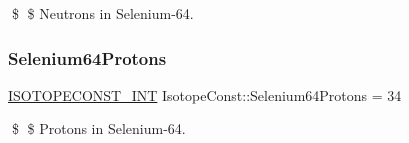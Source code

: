 \$ \$ Neutrons in Selenium-\/64. \mbox{\label{group___isotope_const-_selenium-_se64_ga47498d75298e505775af78463e106aaa}} 
\subsubsection{\texorpdfstring{Selenium64\+Protons}{Selenium64Protons}}
{\footnotesize\ttfamily \mbox{\hyperlink{group___isotope_const-_macros_ga5f18360b3e99483a35c32d789e62621c}{I\+S\+O\+T\+O\+P\+E\+C\+O\+N\+S\+T\+\_\+\+I\+NT}} Isotope\+Const\+::\+Selenium64\+Protons = 34}

\$ \$ Protons in Selenium-\/64. 